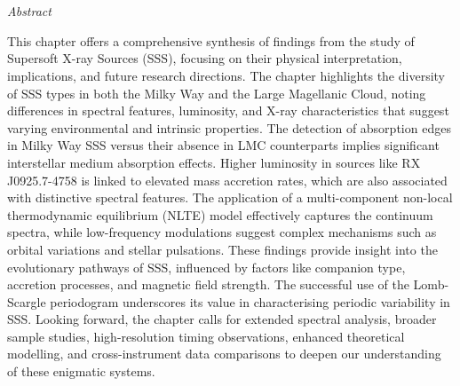 \def\baselinestretch{1}
\chapter{\MakeUppercase{\ChapterTitleSeven}} \label{chap:conclusion}
    \minitoc
    
    \newpage
    \begin{center}
    	\emph{Abstract}
    \end{center}
    This chapter offers a comprehensive synthesis of findings from the study of Supersoft X-ray Sources (SSS), focusing on their physical interpretation, implications, and future research directions. The chapter highlights the diversity of SSS types in both the Milky Way and the Large Magellanic Cloud, noting differences in spectral features, luminosity, and X-ray characteristics that suggest varying environmental and intrinsic properties. The detection of absorption edges in Milky Way SSS versus their absence in LMC counterparts implies significant interstellar medium absorption effects. Higher luminosity in sources like RX J0925.7-4758 is linked to elevated mass accretion rates, which are also associated with distinctive spectral features. The application of a multi-component non-local thermodynamic equilibrium (NLTE) model effectively captures the continuum spectra, while low-frequency modulations suggest complex mechanisms such as orbital variations and stellar pulsations. These findings provide insight into the evolutionary pathways of SSS, influenced by factors like companion type, accretion processes, and magnetic field strength. The successful use of the Lomb-Scargle periodogram underscores its value in characterising periodic variability in SSS. Looking forward, the chapter calls for extended spectral analysis, broader sample studies, high-resolution timing observations, enhanced theoretical modelling, and cross-instrument data comparisons to deepen our understanding of these enigmatic systems.
    
    \newpage
